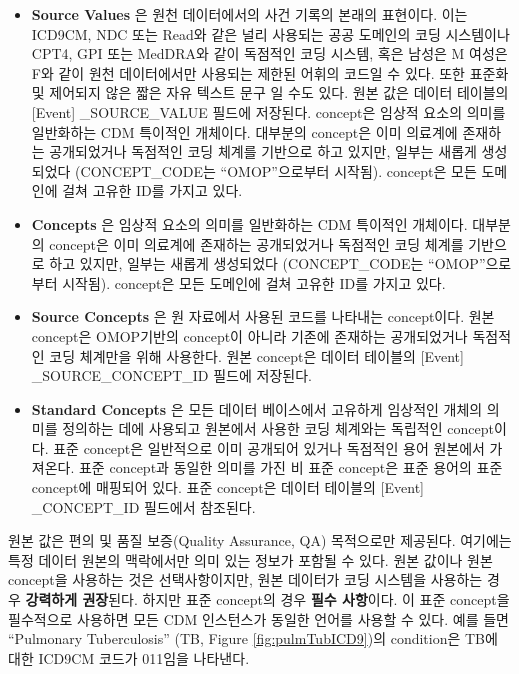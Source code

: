 \documentclass[11pt]{book}
\providecommand{\tightlist}{%
  \setlength{\itemsep}{0pt}\setlength{\parskip}{0pt}}
\theoremstyle{definition}
\theoremstyle{definition}
\theoremstyle{definition}
\theoremstyle{remark}
\begin{document}
\begin{itemize}
\tightlist
\item
  \textbf{Source Values} 은 원천 데이터에서의 사건 기록의 본래의
  표현이다. 이는 ICD9CM, NDC 또는 Read와 같은 널리 사용되는 공공
  도메인의 코딩 시스템이나 CPT4, GPI 또는 MedDRA와 같이 독점적인 코딩
  시스템, 혹은 남성은 M 여성은 F와 같이 원천 데이터에서만 사용되는
  제한된 어휘의 코드일 수 있다. 또한 표준화 및 제어되지 않은 짧은 자유
  텍스트 문구 일 수도 있다. 원본 값은 데이터 테이블의 {[}Event{]}
  \_SOURCE\_VALUE 필드에 저장된다. concept은 임상적 요소의 의미를
  일반화하는 CDM 특이적인 개체이다. 대부분의 concept은 이미 의료계에
  존재하는 공개되었거나 독점적인 코딩 체계를 기반으로 하고 있지만,
  일부는 새롭게 생성되었다 (CONCEPT\_CODE는 ``OMOP''으로부터 시작됨).
  concept은 모든 도메인에 걸쳐 고유한 ID를 가지고 있다.
\item
  \textbf{Concepts} 은 임상적 요소의 의미를 일반화하는 CDM 특이적인
  개체이다. 대부분의 concept은 이미 의료계에 존재하는 공개되었거나
  독점적인 코딩 체계를 기반으로 하고 있지만, 일부는 새롭게 생성되었다
  (CONCEPT\_CODE는 ``OMOP''으로부터 시작됨). concept은 모든 도메인에
  걸쳐 고유한 ID를 가지고 있다.
\item
  \textbf{Source Concepts} 은 원 자료에서 사용된 코드를 나타내는
  concept이다. 원본 concept은 OMOP기반의 concept이 아니라 기존에
  존재하는 공개되었거나 독점적인 코딩 체계만을 위해 사용한다. 원본
  concept은 데이터 테이블의 {[}Event{]} \_SOURCE\_CONCEPT\_ID 필드에
  저장된다.
\item
  \textbf{Standard Concepts} 은 모든 데이터 베이스에서 고유하게 임상적인
  개체의 의미를 정의하는 데에 사용되고 원본에서 사용한 코딩 체계와는
  독립적인 concept이다. 표준 concept은 일반적으로 이미 공개되어 있거나
  독점적인 용어 원본에서 가져온다. 표준 concept과 동일한 의미를 가진 비
  표준 concept은 표준 용어의 표준 concept에 매핑되어 있다. 표준
  concept은 데이터 테이블의 {[}Event{]} \_CONCEPT\_ID 필드에서 참조된다.
\end{itemize}

원본 값은 편의 및 품질 보증(Quality Assurance, QA) 목적으로만 제공된다.
여기에는 특정 데이터 원본의 맥락에서만 의미 있는 정보가 포함될 수 있다.
원본 값이나 원본 concept을 사용하는 것은 선택사항이지만, 원본 데이터가
코딩 시스템을 사용하는 경우 \textbf{강력하게 권장}된다. 하지만 표준
concept의 경우 \textbf{필수 사항}이다. 이 표준 concept을 필수적으로
사용하면 모든 CDM 인스턴스가 동일한 언어를 사용할 수 있다. 예를 들면
``Pulmonary Tuberculosis'' (TB, Figure \ref{fig:pulmTubICD9})의
condition은 TB에 대한 ICD9CM 코드가 011임을 나타낸다.
\end{document}
